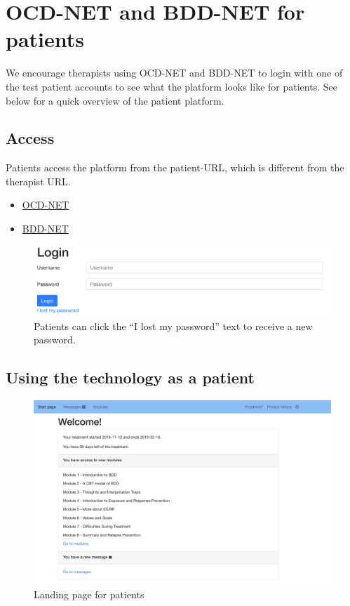 \documentclass[]{book}
\providecommand{\tightlist}{%
  \setlength{\itemsep}{0pt}\setlength{\parskip}{0pt}}
\begin{document}
\hypertarget{ocd-net-and-bdd-net-for-patients}{%
\section{OCD-NET and BDD-NET for patients}\label{ocd-net-and-bdd-net-for-patients}}

We encourage therapists using OCD-NET and BDD-NET to login with one of the test patient accounts to see what the platform looks like for patients. See below for a quick overview of the patient platform.

\hypertarget{access}{%
\subsection{Access}\label{access}}

Patients access the platform from the patient-URL, which is different from the therapist URL.

\begin{itemize}
\tightlist
\item
  \href{https://ocdnet.webcbt.se}{OCD-NET}\\
\item
  \href{https://bddnet.webcbt.se}{BDD-NET}
\end{itemize}

\begin{figure}
\centering
\includegraphics{images/patient-login.png}
\caption{Patients can click the ``I lost my password'' text to receive a new password.}
\end{figure}

\hypertarget{using-the-technology-as-a-patient}{%
\subsection{Using the technology as a patient}\label{using-the-technology-as-a-patient}}

\begin{figure}
\centering
\includegraphics{images/patient-overview.png}
\caption{Landing page for patients}
\end{figure}
\end{document}
